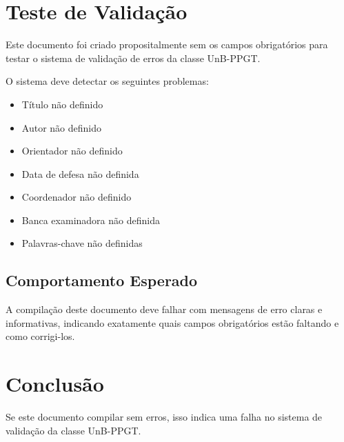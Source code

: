 \documentclass[mestrado,12pt]{UnB-PPGT}
\begin{document}
\pretextual

\capa
\folhaderosto
\folhadeaprovacao

\textual

\chapter{Teste de Validação}

Este documento foi criado propositalmente sem os campos obrigatórios para testar o sistema de validação de erros da classe UnB-PPGT.

O sistema deve detectar os seguintes problemas:
\begin{itemize}
\item Título não definido
\item Autor não definido
\item Orientador não definido
\item Data de defesa não definida
\item Coordenador não definido
\item Banca examinadora não definida
\item Palavras-chave não definidas
\end{itemize}

\section{Comportamento Esperado}

A compilação deste documento deve falhar com mensagens de erro claras e informativas, indicando exatamente quais campos obrigatórios estão faltando e como corrigi-los.

\chapter{Conclusão}

Se este documento compilar sem erros, isso indica uma falha no sistema de validação da classe UnB-PPGT.

\postextual
\end{document}
